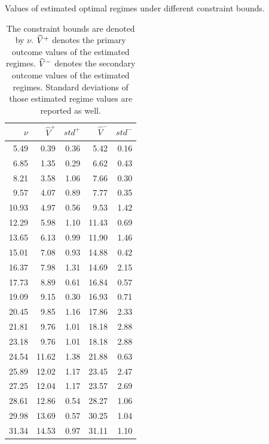 %		
\begin{table}[!htbp]
\caption{Values of estimated optimal regimes under different constraint bounds.}
	\centering
\begin{tabular}{rrrrr}\hline 
	$\nu$  & $\widehat{V}^{+}$ & $std^{+}$ & $\widehat{V}^{-}$ & $std^{-}$ \\\hline 
	5.49 &     0.39 &     0.36 &     5.42  &     0.16 \\ 
	6.85 &     1.35 &     0.29 &     6.62  &     0.43 \\ 
	8.21 &     3.58 &     1.06 &     7.66  &     0.30 \\ 
	9.57 &     4.07 &     0.89 &     7.77  &     0.35 \\ 
	10.93 &     4.97 &     0.56 &     9.53  &     1.42 \\ 
	12.29 &     5.98 &     1.10 &    11.43  &     0.69 \\ 
	13.65 &     6.13 &     0.99 &    11.90  &     1.46 \\ 
	15.01 &     7.08 &     0.93 &    14.88  &     0.42 \\ 
	16.37 &     7.98 &     1.31 &    14.69  &     2.15 \\ 
	17.73 &     8.89 &     0.61 &    16.84  &     0.57 \\ 
	19.09 &     9.15 &     0.30 &    16.93  &     0.71 \\ 
	20.45 &     9.85 &     1.16 &    17.86  &     2.33 \\ 
	21.81 &     9.76 &     1.01 &    18.18  &     2.88 \\ 
	23.18 &     9.76 &     1.01 &    18.18  &     2.88 \\ 
	24.54 &    11.62 &     1.38 &    21.88  &     0.63 \\ 
	25.89 &    12.02 &     1.17 &    23.45  &     2.47 \\ 
	27.25 &    12.04 &     1.17 &    23.57  &     2.69 \\ 
	28.61 &    12.86 &     0.54 &    28.27  &     1.06 \\ 
	29.98 &    13.69 &     0.57 &    30.25  &     1.04 \\ 
	31.34 &    14.53 &     0.97 &    31.11  &     1.10 \\ \hline 
\end{tabular}
\caption*{The constraint bounds are denoted by $\nu$. $\widehat{V}^{+}$ denotes the primary outcome values of the estimated regimes. $\widehat{V}^{-}$ denotes the secondary outcome values of the estimated regimes. Standard deviations of those estimated regime values are reported as well.}
\end{table} 
